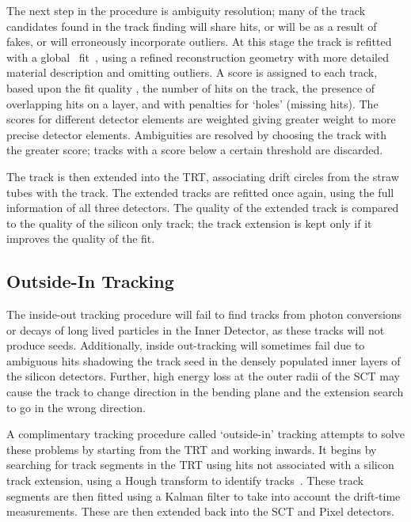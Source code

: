 The next step in the procedure is ambiguity resolution; many of the track
candidates found in the track finding will share hits, or will be as a result of
fakes, or will erroneously incorporate outliers. At this stage the track is
refitted with a global \chisquared\ fit~\cite{1742-6596-119-3-032013}, using a
refined reconstruction geometry with more detailed material description and
omitting outliers.  A score is assigned to each track, based upon the fit
quality \chisquaredndof, the number of hits on the track, the presence of
overlapping hits on a layer, and with penalties for `holes' (missing hits). The
scores for different detector elements are weighted giving greater weight to
more precise detector elements. Ambiguities are resolved by choosing the track
with the greater score; tracks with a score below a certain threshold are
discarded.

The track is then extended into the TRT, associating drift circles from the
straw tubes with the track. The extended tracks are refitted once again, using
the full information of all three detectors. The quality of the extended track
is compared to the quality of the silicon only track; the track extension is
kept only if it improves the quality of the fit.

\subsection{Outside-In Tracking}

The inside-out tracking procedure will fail to find tracks from photon
conversions or decays of long lived particles in the Inner Detector, as these
tracks will not produce seeds. Additionally, inside out-tracking will sometimes
fail due to ambiguous hits shadowing the track seed in the densely populated
inner layers of the silicon detectors. Further, high energy loss at the outer
radii of the SCT may cause the track to change direction in the bending plane
and the extension search to go in the wrong direction. 

A complimentary tracking procedure called `outside-in' tracking attempts to
solve these problems by starting from the TRT and working inwards. It begins by
searching for track segments in the TRT using hits not associated with a silicon
track extension, using a Hough transform to identify
tracks~\cite{Baines:683897}. These track segments are then fitted using a Kalman
filter to take into account the drift-time measurements. These are then extended
back into the SCT and Pixel detectors.
